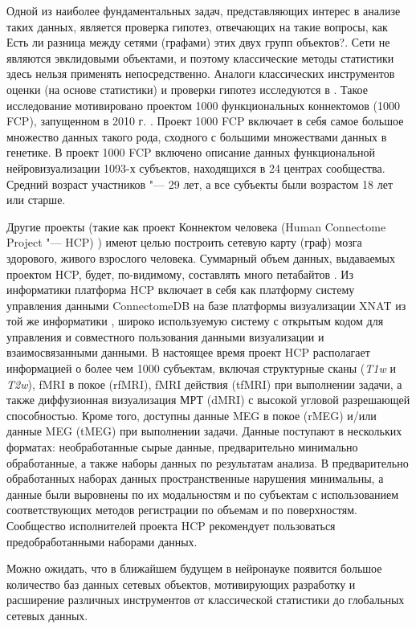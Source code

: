 Одной из наиболее фундаментальных задач, представляющих интерес в анализе таких данных, является проверка гипотез, 
отвечающих на такие вопросы, как Есть ли разница между сетями (графами) этих двух групп объектов?. Сети не являются 
эвклидовыми объектами, и поэтому классические методы статистики здесь нельзя применять непосредственно. Аналоги 
классических инструментов оценки (на основе статистики) и проверки гипотез исследуются в 
\cite{ginestet2017hypothesis, ginestet2014statistical}. Такое исследование мотивировано проектом 1000 функциональных 
коннектомов (1000 FCP), запущенном в 2010 г. \cite{biswal2010toward}. Проект 1000 FCP \cite{yan2013standardizing} 
включает в себя самое большое множество данных такого рода, сходного с большими множествами данных в генетике. 
В проект 1000 FCP включено описание данных функциональной нейровизуализации 1093-х субъектов, находящихся в 
24 центрах сообщества. Средний возраст участников "--- 29 лет, а все субъекты были возрастом 18 лет или старше.


Другие проекты (такие как проект Коннектом человека (Human Connectome Project "--- HCP) \cite{VanEssen2013}) имеют 
целью построить сетевую карту (граф) мозга здорового, живого взрослого человека. Суммарный объем данных, выдаваемых 
проектом HCP, будет, по-видимому, составлять много петабайтов \cite{VanEssen2013}. Из информатики платформа HCP 
включает в себя как платформу систему управления данными ConnectomeDB на базе платформы визуализации XNAT из той 
же информатики \cite{marcus2007extensible}, широко используемую систему с открытым кодом для управления и совместного 
пользования данными визуализации и взаимосвязанными данными. В настоящее время проект HCP располагает информацией о 
более чем 1000 субъектам, включая структурные сканы (\textit{T1w} и \textit{T2w}), fMRI в покое (rfMRI), 
fMRI действия (tfMRI) при выполнении задачи, а также диффузионная визуализация МРТ (dMRI) с высокой угловой 
разрешающей способностью. Кроме того, доступны данные MEG в покое (rMEG) и/или данные MEG (tMEG) при выполнении задачи. 
Данные поступают в нескольких форматах: необработанные сырые данные, предварительно минимально обработанные, 
а также наборы данных по результатам анализа. В предварительно обработанных наборах данных пространственные нарушения 
минимальны, а данные были выровнены по их модальностям и по субъектам с использованием соответствующих методов 
регистрации по объемам и по поверхностям. Сообщество исполнителей проекта HCP рекомендует пользоваться 
предобработанными наборами данных. 

Можно ожидать, что в ближайшем будущем в нейронауке появится большое количество баз данных сетевых объектов, 
мотивирующих разработку и расширение различных инструментов от классической статистики до глобальных сетевых данных.

